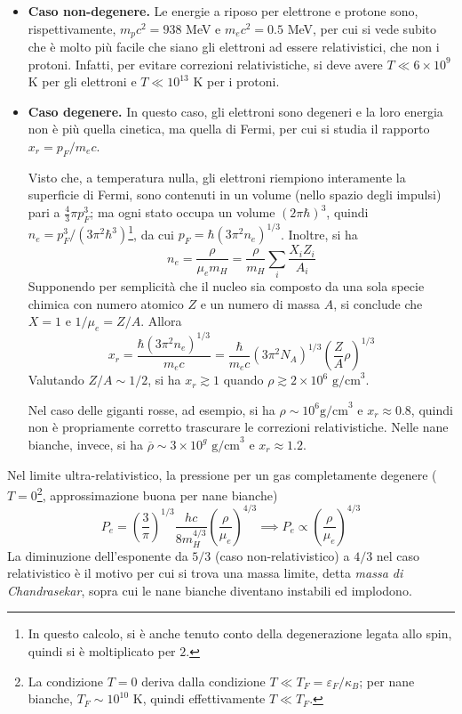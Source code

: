 \documentclass[11pt, a4paper]{scrartcl}
\theoremstyle{style}
\theoremstyle{style1}
\numberwithin{equation}{subsection}
\begin{document}
\begin{itemize}
	\item \textbf{Caso non-degenere.} 
Le energie a riposo per elettrone e protone sono, rispettivamente, $m_p c^2 = 938$ MeV e $m_e c^2 = 0.5$ MeV, per cui si vede subito che \`e molto pi\`u facile che siano gli elettroni ad essere relativistici, che non i protoni.
Infatti, per evitare correzioni relativistiche, si deve avere $T \ll 6 \times 10 ^{9}$ K per gli elettroni e $T \ll 10^{13}$ K per i protoni.
\item \textbf{Caso degenere.} 
	In questo caso, gli elettroni sono degeneri e la loro energia non \`e pi\`u quella cinetica, ma quella di Fermi, per cui si studia il rapporto $x_r = p_F / m_e c$.

	Visto che, a temperatura nulla, gli elettroni riempiono interamente la superficie di Fermi, sono contenuti in un volume (nello spazio degli impulsi) pari a $\frac{4}{3} \pi p_F^3$; ma ogni stato occupa un volume $(2\pi \hbar )^3$, quindi $n_e = p_F^3 / (3 \pi ^2 \hbar ^3)$\footnote{In questo calcolo, si \`e anche tenuto conto della degenerazione legata allo spin, quindi si \`e moltiplicato per $2$.}, da cui $p_F = \hbar (3\pi^2 n_e)^{1 / 3}$.
	Inoltre, si ha
	\[
	n_e = \frac{\rho }{\mu _e m_H} = \frac{\rho }{m_H} \sum_{i}^{} \frac{X_i Z_i}{A_i}
	\] 
	Supponendo per semplicit\`a che il nucleo sia composto da una sola specie chimica con numero atomico $Z$ e un numero di massa $A$, si conclude che $X = 1$ e $1 / \mu _e = Z/A$.
	Allora
	\[
	x_r = \frac{\hbar (3 \pi^2 n_e)^{ 1 / 3}}{m_e c} = \frac{\hbar }{m_e c} (3 \pi ^2 N_A) ^{ 1 / 3} \left(\frac{Z}{A}\rho \right) ^{ 1 / 3}
	\] 
	Valutando $Z / A \sim 1 / 2$, si ha $x_r \gtrsim 1$ quando $\rho \gtrsim 2 \times 10 ^{6} \text{ g/cm}^3$.

	Nel caso delle giganti rosse, ad esempio, si ha $\rho  \sim 10^{6} \text{g/cm}^3$ e $x_r \approx 0.8$, quindi non \`e propriamente corretto trascurare le correzioni relativistiche.
	Nelle nane bianche, invece, si ha $\overline{\rho } \sim 3 \times  10^g \text{ g/cm}^3$ e $x_r\approx 1.2$.
\end{itemize}
Nel limite ultra-relativistico, la pressione per un gas completamente degenere ($T = 0$\footnote{La condizione $T=0$ deriva dalla condizione $T\ll T_F = \varepsilon _F / \kappa _B$; per nane bianche, $T_F \sim 10^{10}$ K, quindi effettivamente $T\ll T_F$.}, approssimazione buona per nane bianche)
\[
P_e = \left(\frac{3}{\pi}\right) ^{1 / 3} \frac{hc }{8 m _H ^{4 / 3}} \left(\frac{\rho}{\mu _e} \right) ^{4 / 3} \implies P_e \propto \left(\frac{\rho}{\mu _e}\right)  ^{4  / 3}
\] 
La diminuzione dell'esponente da $5 / 3$ (caso non-relativistico) a $4 / 3$ nel caso relativistico \`e il motivo per cui si trova una massa limite, detta \textit{massa di Chandrasekar}, sopra cui le nane bianche diventano instabili ed implodono.
\end{document}

